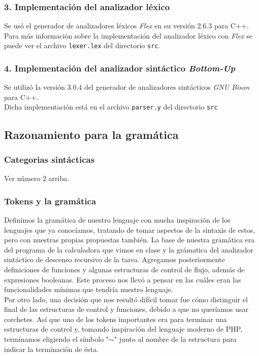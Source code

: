 \documentclass[12pt]{article}
\begin{document}
\subsubsection*{3. Implementación del analizador léxico}
Se usó el generador de analizadores léxicos \textit{Flex} en su versión 2.6.3 para C++. \\
Para más información sobre la implementación del analizador léxico con \textit{Flex} se puede ver el archivo \texttt{lexer.lex} del directorio \texttt{src}.\\
\subsubsection*{4. Implementación del analizador sintáctico \textit{Bottom-Up}}
Se utilizó la versión 3.0.4 del generador de analizadores sintácticos \textit{GNU Bison} para C++. \\
Dicha implementación está en el archivo \texttt{parser.y} del directorio \texttt{src}

\subsection*{Razonamiento para la gramática}
\subsubsection*{Categorias sintácticas}
Ver número 2 arriba.
\subsubsection*{Tokens y la gramática}
Definimos la gramática de nuestro lenguaje con mucha inspiración de los lenguajes que ya conocíamos, tratando de tomar aspectos de la sintaxis de estos, pero con nuestras propias propuestas también. La base de nuestra gramática era del programa de la calculadora que vimos en clase y la grámatica del analizador sintáctico de descenso recursivo de la tarea. Agregamos posteriormente definiciones de funciones y algunas estructuras de control de flujo, además de expresiones booleanas. Este proceso nos llevó a pensar en las cuáles eran las funcionalidades mínimas que tendría nuestro lenguaje. \\

Por otro lado, una decisión que nos resultó difícil tomar fue cómo distinguir el final de las estructuras de control y funciones, debido a que no queríamos usar corchetes. Así que uno de los tokens importantes era para terminar una estructuras de control y, tomando inspiración del lenguaje moderno de PHP, terminamos eligiendo el símbolo "$\sim$" junto al nombre de la estructura para indicar la terminación de ésta. \\
\end{document}
